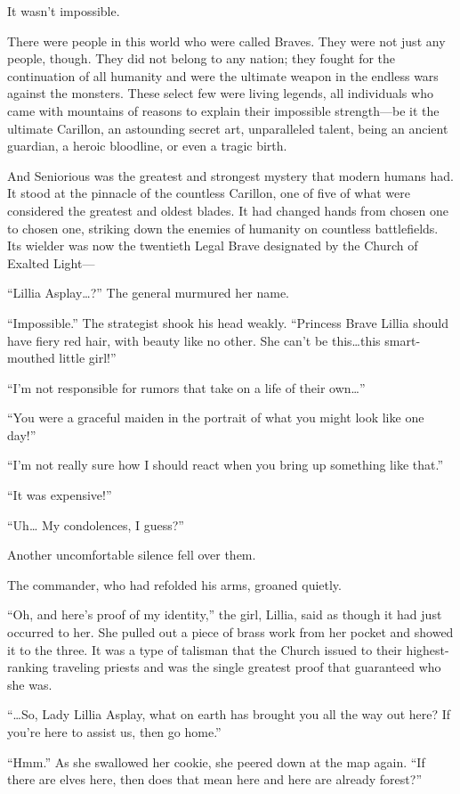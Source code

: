 It wasn’t impossible.

There were people in this world who were called Braves. They were not just any people, though. They did not belong to any nation; they fought for the continuation of all humanity and were the ultimate weapon in the endless wars against the monsters. These select few were living legends, all individuals who came with mountains of reasons to explain their impossible strength—be it the ultimate Carillon, an astounding secret art, unparalleled talent, being an ancient guardian, a heroic bloodline, or even a tragic birth.

And Seniorious was the greatest and strongest mystery that modern humans had. It stood at the pinnacle of the countless Carillon, one of five of what were considered the greatest and oldest blades. It had changed hands from chosen one to chosen one, striking down the enemies of humanity on countless battlefields. Its wielder was now the twentieth Legal Brave designated by the Church of Exalted Light—

“Lillia Asplay…?” The general murmured her name.

“Impossible.” The strategist shook his head weakly. “Princess Brave Lillia should have fiery red hair, with beauty like no other. She can’t be this…this smart-mouthed little girl!”

“I’m not responsible for rumors that take on a life of their own…”

“You were a graceful maiden in the portrait of what you might look like one day!”

“I’m not really sure how I should react when you bring up something like that.”

“It was expensive!”

“Uh… My condolences, I guess?”

Another uncomfortable silence fell over them.

The commander, who had refolded his arms, groaned quietly.

“Oh, and here’s proof of my identity,” the girl, Lillia, said as though it had just occurred to her. She pulled out a piece of brass work from her pocket and showed it to the three. It was a type of talisman that the Church issued to their highest-ranking traveling priests and was the single greatest proof that guaranteed who she was.

“…So, Lady Lillia Asplay, what on earth has brought you all the way out here? If you’re here to assist us, then go home.”

“Hmm.” As she swallowed her cookie, she peered down at the map again. “If there are elves here, then does that mean here and here are already forest?”

